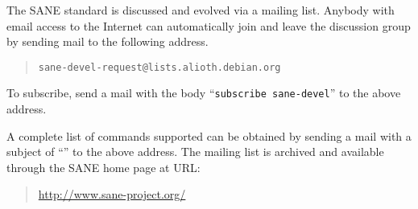 \documentclass[11pt,DVIps]{report}
\begin{document}
The SANE standard is discussed and evolved via a mailing list.
Anybody with email access to the Internet can automatically join and
leave the discussion group by sending mail to the following address.
\begin{quote}
\begin{verbatim}
sane-devel-request@lists.alioth.debian.org
\end{verbatim}
\end{quote}
To subscribe, send a mail with the body ``\verb|subscribe sane-devel|'' to the
above address.

A complete list of commands supported can be obtained by sending a
mail with a subject of ``'' to the above address.  The
mailing list is archived and available through the SANE home page at
URL:
\begin{quote}
\url{http://www.sane-project.org/}
\end{quote}

\newpage

\end{document}
